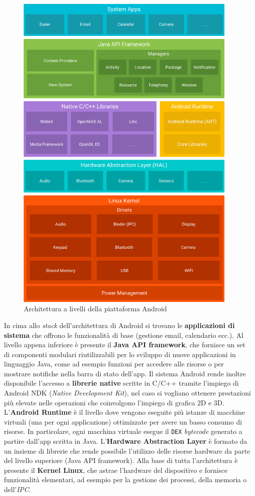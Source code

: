 \documentclass[12pt,a4paper,oneside]{article}
\begin{document}
\begin{figure}[!htb]
    \centering
    \includegraphics[height=16cm]{resources/images/android_stack.png}
    \caption{Architettura a livelli della piattaforma Android}\label{fig:android_stack}
\end{figure}

\noindent In cima allo \textit{stack} dell'architettura di Android si trovano le \textbf{applicazioni di sistema} che offrono le funzionalità di base (gestione email, calendario ecc.). Al livello appena inferiore è presente il \textbf{Java \acrshort{API} framework}, che fornisce un set di componenti modulari riutilizzabili per lo sviluppo di nuove applicazioni in linguaggio Java, come ad esempio funzioni per accedere alle risorse o per mostrare notifiche nella barra di stato dell'app. Il sistema Android rende inoltre disponibile l'accesso a \textbf{librerie native} scritte in \mbox{C/C++} tramite l'impiego di Android NDK (\textit{Native Development Kit}), nel caso si vogliano ottenere prestazioni più elevate nelle operazioni che coinvolgono l'impiego di grafica $2$D e $3$D. L'\textbf{Android Runtime} è il livello dove vengono eseguite più istanze di macchine virtuali (una per ogni applicazione) ottimizzate per avere un basso consumo di risorse. In particolare, ogni macchina virtuale esegue il \texttt{DEX} \textit{bytecode} generato a partire dall'app scritta in Java. L'\textbf{Hardware Abstraction Layer} è formato da un insieme di librerie che rende possibile l'utilizzo delle risorse hardware da parte del livello superiore (Java \acrshort{API} framework). Alla base di tutta l'architettura è presente il \textbf{Kernel Linux}, che astrae l'hardware del dispositivo e fornisce funzionalità elementari, ad esempio per la gestione dei processi, della memoria o dell'\textit{\gls{IPC}}.
\end{document}
